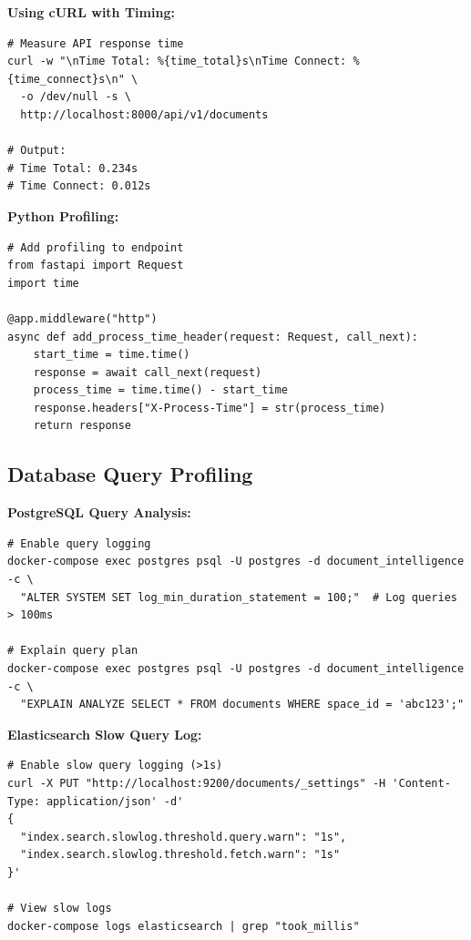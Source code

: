 \textbf{Using cURL with Timing:}
\begin{commandbox}
\begin{lstlisting}[style=bashstyle]
# Measure API response time
curl -w "\nTime Total: %{time_total}s\nTime Connect: %{time_connect}s\n" \
  -o /dev/null -s \
  http://localhost:8000/api/v1/documents

# Output:
# Time Total: 0.234s
# Time Connect: 0.012s
\end{lstlisting}
\end{commandbox}

\textbf{Python Profiling:}
\begin{lstlisting}[style=pythonstyle]
# Add profiling to endpoint
from fastapi import Request
import time

@app.middleware("http")
async def add_process_time_header(request: Request, call_next):
    start_time = time.time()
    response = await call_next(request)
    process_time = time.time() - start_time
    response.headers["X-Process-Time"] = str(process_time)
    return response
\end{lstlisting}

\subsection{Database Query Profiling}

\textbf{PostgreSQL Query Analysis:}
\begin{commandbox}
\begin{lstlisting}[style=bashstyle]
# Enable query logging
docker-compose exec postgres psql -U postgres -d document_intelligence -c \
  "ALTER SYSTEM SET log_min_duration_statement = 100;"  # Log queries > 100ms

# Explain query plan
docker-compose exec postgres psql -U postgres -d document_intelligence -c \
  "EXPLAIN ANALYZE SELECT * FROM documents WHERE space_id = 'abc123';"
\end{lstlisting}
\end{commandbox}

\textbf{Elasticsearch Slow Query Log:}
\begin{commandbox}
\begin{lstlisting}[style=bashstyle]
# Enable slow query logging (>1s)
curl -X PUT "http://localhost:9200/documents/_settings" -H 'Content-Type: application/json' -d'
{
  "index.search.slowlog.threshold.query.warn": "1s",
  "index.search.slowlog.threshold.fetch.warn": "1s"
}'

# View slow logs
docker-compose logs elasticsearch | grep "took_millis"
\end{lstlisting}
\end{commandbox}

